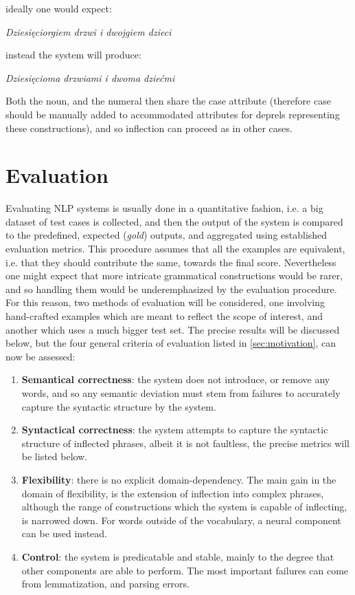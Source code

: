 \documentclass[12pt]{article}
\newcommand{\gloss}[1]{\vspace{10pt}\indent\textit{#1}\vspace{5pt}}
\begin{document}
\noindent ideally one would expect:

\gloss{Dziesięciorgiem drzwi i dwojgiem dzieci}

\noindent instead the system will produce:

\gloss{Dziesięcioma drzwiami i dwoma dziećmi}

\noindent Both the noun, and the numeral then share the case attribute (therefore case should be manually added to accommodated attributes for deprels representing these constructions), and so inflection can proceed as in other cases.

\section{Evaluation}
Evaluating NLP systems is usually done in a quantitative fashion, i.e. a big dataset of test cases is collected, and then the output of the system is compared to the predefined, expected (\textit{gold}) outputs, and aggregated using established evaluation metrics. This procedure assumes that all the examples are equivalent, i.e. that they should contribute the same, towards the final score. Nevertheless one might expect that more intricate grammatical constructions would be rarer, and so handling them would be underemphasized by the evaluation procedure. For this reason, two methods of evaluation will be considered, one involving hand-crafted examples which are meant to reflect the scope of interest, and another which uses a much bigger test set. The precise results will be discussed below, but the four general criteria of evaluation listed in \autoref{sec:motivation}, can now be assessed:

\begin{enumerate}
\item \textbf{Semantical correctness}: the system does not introduce, or remove any words, and so any semantic deviation must stem from failures to accurately capture the syntactic structure by the system.
\item \textbf{Syntactical correctness}: the system attempts to capture the syntactic structure of inflected phrases, albeit it is not faultless, the precise metrics will be listed below.
\item \textbf{Flexibility}: there is no explicit domain-dependency. The main gain in the domain of flexibility, is the extension of inflection into complex phrases, although the range of constructions which the system is capable of inflecting, is narrowed down. For words outside of the vocabulary, a neural component can be used instead.
\item \textbf{Control}: the system is predicatable and stable, mainly to the degree that other components are able to perform. The most important failures can come from lemmatization, and parsing errors.
\end{enumerate}
\end{document}
